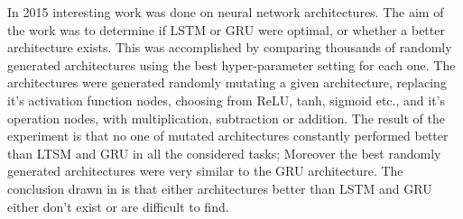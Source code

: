 In 2015 interesting work was done \cite{architectureMutations} on neural network architectures. The aim of the work was to determine if LSTM or GRU were optimal, or whether a better architecture exists. This was accomplished by comparing thousands of randomly generated architectures using the best hyper-parameter setting for each one. The architectures were generated randomly mutating a given architecture, replacing it's activation function nodes, choosing from ReLU, tanh, sigmoid etc., and it's operation nodes, with multiplication, subtraction or addition. The result of the experiment is that no one of mutated architectures constantly performed better than LTSM and GRU in all the considered tasks; Moreover the best randomly generated architectures were very similar to the GRU architecture. The conclusion drawn in \cite{architectureMutations}  is that either architectures better than LSTM and GRU  either don't exist or are difficult to find. 
